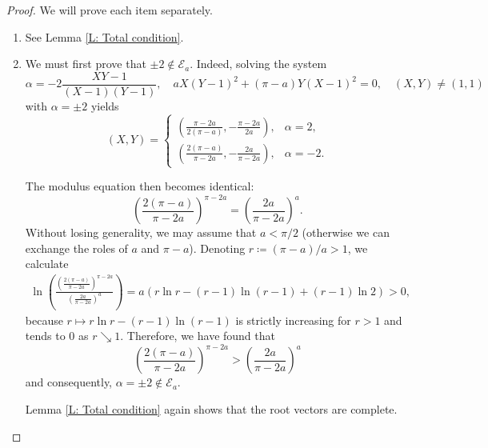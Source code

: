 \documentclass[11pt, a4paper,reqno]{amsart}
\theoremstyle{plain}
\theoremstyle{definition}
\theoremstyle{remark}
\newcommand{\1}{\mathds 1}
\begin{document}
\begin{proof}
    We will prove each item separately.
    \begin{enumerate}
        \item See Lemma \ref{L: Total condition}.
        \item We must first prove that $\pm 2 \notin \mathcal E_a$. Indeed, solving the system
        \[
        \alpha = -2\frac{XY - 1}{(X-1)(Y-1)}, \quad aX(Y-1)^2 + (\pi-a)Y(X-1)^2 = 0, \quad (X, Y) \neq (1,1)
        \]
        with $\alpha= \pm 2$ yields
        \[
        (X,Y) = \begin{cases}
            \left(\frac{\pi-2a}{2(\pi-a)}, -\frac{\pi-2a}{2a}\right), & \alpha = 2,\\
            \left(\frac{2(\pi-a)}{\pi-2a}, -\frac{2a}{\pi-2a}\right), & \alpha = -2.
        \end{cases}
        \]
    
        The modulus equation then becomes identical:
        \[
        \left(\frac{2(\pi-a)}{\pi-2a}\right)^{\pi-2a} = \left(\frac{2a}{\pi-2a}\right)^a.
        \]
        Without losing generality, we may assume that $a < \pi/2$ (otherwise we can exchange the roles of $a$ and $\pi - a$). Denoting $r \coloneqq (\pi-a)/a > 1$, we calculate
        \begin{align*}
            \ln\left(\frac{\left(\frac{2(\pi-a)}{\pi-2a}\right)^{\pi-2a}}{\left(\frac{2a}{\pi-2a}\right)^a}\right) = a\left(r\ln r - (r-1)\ln(r-1) + (r-1)\ln 2\right) > 0,
        \end{align*}
        because $r \mapsto r\ln r - (r-1)\ln(r-1)$ is strictly increasing for $r > 1$ and tends to $0$ as $r \searrow 1$. Therefore, we have found that 
        \[
        \left(\frac{2(\pi-a)}{\pi-2a}\right)^{\pi-2a} > \left(\frac{2a}{\pi-2a}\right)^a
        \]
        and consequently, $\alpha = \pm 2 \notin \mathcal E_a$.

        Lemma \ref{L: Total condition} again shows that the root vectors are complete.


\end{enumerate}
\end{proof}
\end{document}
